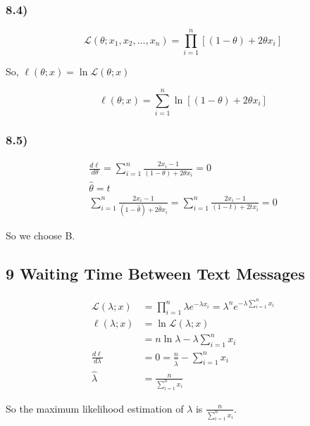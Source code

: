 \documentclass[
]{article}
\begin{document}
\hypertarget{section-14}{%
\subsubsection{8.4)}\label{section-14}}

\[
\mathcal L(\theta; x_1,x_2, ..., x_n) = \prod_{i=1}^n [(1-\theta) + 2\theta x_i]
\]

So, \(\ell(\theta;x) = \ln{\mathcal L(\theta; x)}\)

\[
\ell (\theta; x) = \sum_{i=1}^n\ln{[(1-\theta) + 2\theta x_i]}
\]

\hypertarget{section-15}{%
\subsubsection{8.5)}\label{section-15}}

\[
\begin{aligned}
\frac{d \ell}{d \theta} = \sum_{i=1}^n \frac{2x_i - 1}{(1-\theta) + 2\theta x_i} = 0 \\
\hat{\theta} = t \\
\sum_{i=1}^n \frac{2x_i - 1}{(1-\hat \theta) + 2\hat \theta x_i}= \sum_{i=1}^n \frac{2x_i - 1}{(1-t) + 2t x_i} = 0
\end{aligned}
\]

So we choose B.

\hypertarget{waiting-time-between-text-messages}{%
\subsection{9 Waiting Time Between Text
Messages}\label{waiting-time-between-text-messages}}

\[
\begin{aligned}
\mathcal{L}(\lambda; x) &= \prod_{i=1}^n\lambda e^{-\lambda x_i} = \lambda^n e^{-\lambda \sum_{i=1}^nx_i} \\
\ell (\lambda;x) &= \ln{\mathcal{L}(\lambda;x)} \\
&= n \ln \lambda - \lambda \sum_{i=1}^n x_i \\
\frac{d \ell}{d \lambda} &= 0 = \frac{n}{\hat \lambda}- \sum_{i=1}^n x_i \\
\hat \lambda &= \frac{n}{\sum_{i=1}^n x_i}
\end{aligned}
\]

So the maximum likelihood estimation of \(\lambda\) is
\(\frac{n}{\sum_{i=1}^n x_i}\).
\end{document}
